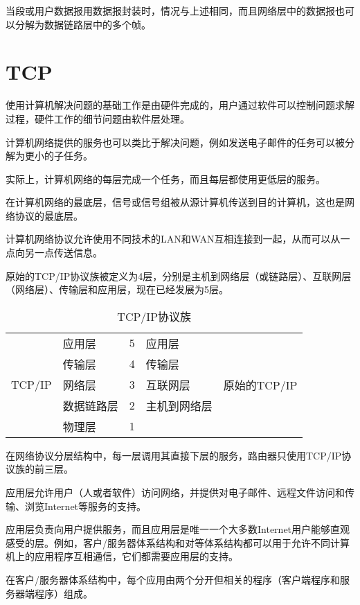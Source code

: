 当段或用户数据报用数据报封装时，情况与上述相同，而且网络层中的数据报也可以分解为数据链路层中的多个帧。






\section{TCP}


使用计算机解决问题的基础工作是由硬件完成的，用户通过软件可以控制问题求解过程，硬件工作的细节问题由软件层处理。

计算机网络提供的服务也可以类比于解决问题，例如发送电子邮件的任务可以被分解为更小的子任务。

实际上，计算机网络的每层完成一个任务，而且每层都使用更低层的服务。

在计算机网络的最底层，信号或信号组被从源计算机传送到目的计算机，这也是网络协议的最底层。

计算机网络协议允许使用不同技术的LAN和WAN互相连接到一起，从而可以从一点向另一点传送信息。

原始的TCP/IP协议族被定义为4层，分别是主机到网络层（或链路层）、互联网层（网络层）、传输层和应用层，现在已经发展为5层。

\begin{table}[htbp]
\centering
\caption{TCP/IP协议族}
\begin{tabular}{|l|l|l|l|l|}
\hline
	& 应用层 & 5 & 应用层 & \\ \cline{2-4}
	&传输层 & 4 & 传输层 & \\ \cline{2-4}
TCP/IP&网络层 & 3 & 互联网层 & 原始的TCP/IP\\ \cline{2-4}
	&数据链路层 & 2 & 主机到网络层 & \\ \cline{2-4}
	&物理层 & 1 & & \\
\hline
\end{tabular}
\end{table}

在网络协议分层结构中，每一层调用其直接下层的服务，路由器只使用TCP/IP协议族的前三层。

应用层允许用户（人或者软件）访问网络，并提供对电子邮件、远程文件访问和传输、浏览Internet等服务的支持。

应用层负责向用户提供服务，而且应用层是唯一一个大多数Internet用户能够直观感受的层。例如，客户/服务器体系结构和对等体系结构都可以用于允许不同计算机上的应用程序互相通信，它们都需要应用层的支持。

在客户/服务器体系结构中，每个应用由两个分开但相关的程序（客户端程序和服务器端程序）组成。

